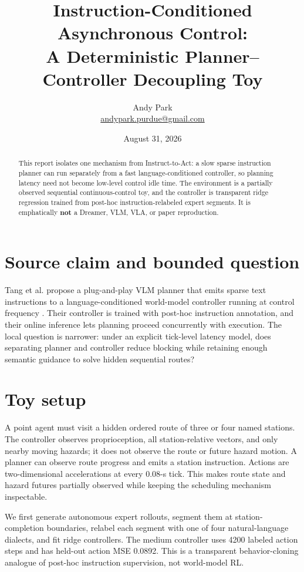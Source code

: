 \documentclass[11pt]{article}
\title{Instruction-Conditioned Asynchronous Control:\\A Deterministic Planner--Controller Decoupling Toy}
\author{Andy Park\\\href{mailto:andypark.purdue@gmail.com}{andypark.purdue@gmail.com}}
\date{August 31, 2026}
\begin{document}
\maketitle
\begin{abstract}
This report isolates one mechanism from Instruct-to-Act: a slow sparse instruction planner can run separately from a fast language-conditioned controller, so planning latency need not become low-level control idle time. The environment is a partially observed sequential continuous-control toy, and the controller is transparent ridge regression trained from post-hoc instruction-relabeled expert segments. It is emphatically \textbf{not} a Dreamer, VLM, VLA, or paper reproduction.
\end{abstract}

\section{Source claim and bounded question}
Tang et al. propose a plug-and-play VLM planner that emits sparse text instructions to a language-conditioned world-model controller running at control frequency \cite{paper,project,code}. Their controller is trained with post-hoc instruction annotation, and their online inference lets planning proceed concurrently with execution. The local question is narrower: under an explicit tick-level latency model, does separating planner and controller reduce blocking while retaining enough semantic guidance to solve hidden sequential routes?

\section{Toy setup}
A point agent must visit a hidden ordered route of three or four named stations. The controller observes proprioception, all station-relative vectors, and only nearby moving hazards; it does not observe the route or future hazard motion. A planner can observe route progress and emits a station instruction. Actions are two-dimensional accelerations at every 0.08-s tick. This makes route state and hazard futures partially observed while keeping the scheduling mechanism inspectable.

We first generate autonomous expert rollouts, segment them at station-completion boundaries, relabel each segment with one of four natural-language dialects, and fit ridge controllers. The medium controller uses 4200 labeled action steps and has held-out action MSE 0.0892. This is a transparent behavior-cloning analogue of post-hoc instruction supervision, not world-model RL.
\end{document}
